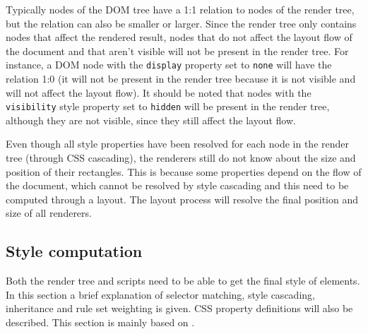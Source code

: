 \documentclass[a4paper,11pt]{kth-mag}
\newcommand{\code}[1]{\texttt{#1}}
\begin{document}
        Typically nodes of the \gls{DOM} tree have a 1:1 relation to nodes of the \gls{render tree}, but the relation can also be smaller or larger.
        Since the \gls{render tree} only contains nodes that affect the rendered result, nodes that do not affect the layout flow of the \gls{document} and that aren't visible will not be present in the \gls{render tree}.
        For instance, a \gls{DOM} node with the \code{display} property set to \code{none} will have the relation 1:0 (it will not be present in the \gls{render tree} because it is not visible and will not affect the layout flow).
        It should be noted that nodes with the \code{visibility} style property set to \code{hidden} will be present in the \gls{render tree}, although they are not visible, since they still affect the layout flow.

        Even though all style properties have been resolved for each node in the \gls{render tree} (through \gls{CSS} cascading), the renderers still do not know about the size and position of their rectangles.
        This is because some properties depend on the flow of the \gls{document}, which cannot be resolved by style cascading and this need to be computed through a layout.
        The layout process will resolve the final position and size of all renderers.

      \subsection{Style computation}\label{sec:style-computation}
        Both the \gls{render tree} and scripts need to be able to get the final style of \glspl{element}.
        In this section a brief explanation of selector matching, style cascading, inheritance and rule set weighting is given.
        \gls{CSS} property definitions will also be described.
        This section is mainly based on .
\end{document}
